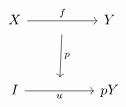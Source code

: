 \[\begin{tikzcd}
	X && Y \\
	\\
	I && pY
	\arrow[""{name=0, anchor=center, inner sep=0}, "u"', from=3-1, to=3-3]
	\arrow[""{name=1, anchor=center, inner sep=0}, "f", from=1-1, to=1-3]
	\arrow["p", shorten <=9pt, shorten >=9pt, from=1, to=0]
\end{tikzcd}\]